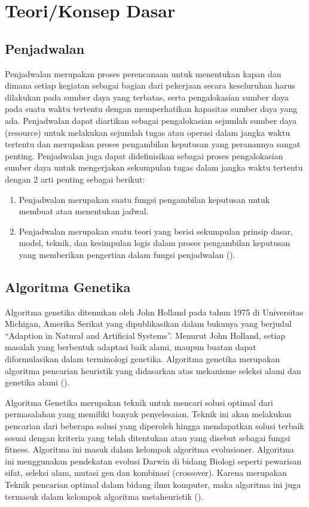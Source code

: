 \section{Teori/Konsep Dasar}

\subsection{Penjadwalan}
Penjadwalan merupakan proses perencanaan untuk menentukan kapan dan dimana setiap \linebreak kegiatan sebagai bagian dari pekerjaan secara keseluruhan harus dilakukan pada sumber daya yang terbatas, serta pengalokasian sumber daya pada suatu waktu tertentu dengan memperhatikan kapasitas sumber daya yang ada. 
Penjadwalan dapat diartikan sebagai pengalokasian sejumlah sumber daya (resource) untuk melakukan sejumlah tugas atau operasi dalam jangka waktu tertentu dan merupakan proses pengambilan keputusan yang peranannya sangat penting. 
Penjadwalan juga dapat didefinisikan sebagai proses pengalokasian sumber daya untuk mengerjakan sekumpulan tugas dalam jangka waktu tertentu dengan 2 arti penting sebagai berikut: 
\begin{enumerate}
  \item Penjadwalan merupakan suatu fungsi pengambilan keputusan untuk membuat atau \linebreak menentukan jadwal. 
  \item Penjadwalan merupakan suatu teori yang berisi sekumpulan prinsip dasar, model, teknik, dan kesimpulan logis dalam proses pengambilan keputusan yang memberikan pengertian dalam fungsi penjadwalan (\cite{prasetya2017penjadwalan}).
\end{enumerate}

\subsection{Algoritma Genetika}
Algoritma genetika ditemukan oleh John Holland pada tahun 1975 di Universitas Michigan, Amerika Serikat yang dipublikasikan dalam bukunya yang berjudul “Adaption in Natural and Artificial Systems”. 
Menurut John Holland, setiap masalah yang berbentuk adaptasi baik alami, maupun buatan dapat diformulasikan dalam terminologi genetika. Algoritma genetika merupakan algoritma pencarian heuristik yang didasarkan atas mekanisme seleksi alami dan genetika alami (\cite{Mauluddin2018}). 

Algoritma Genetika merupakan teknik untuk mencari solusi optimal dari permasalahan yang memiliki banyak penyelesaian. 
Teknik ini akan melakukan pencarian dari beberapa solusi yang diperoleh hingga mendapatkan solusi terbaik sesuai dengan kriteria yang telah ditentukan atau yang disebut sebagai fungsi fitness. 
Algoritma ini masuk dalam kelompok algoritma evolusioner. Algoritma ini menggunakan pendekatan evolusi Darwin di bidang Biologi seperti pewarisan sifat, seleksi alam, mutasi gen dan kombinasi (crossover).  
Karena merupakan Teknik pencarian optimal dalam bidang ilmu komputer, maka algoritma ini juga termasuk dalam kelompok algoritma metaheuristik (\cite{binusAlgoritmaGenetika}).

